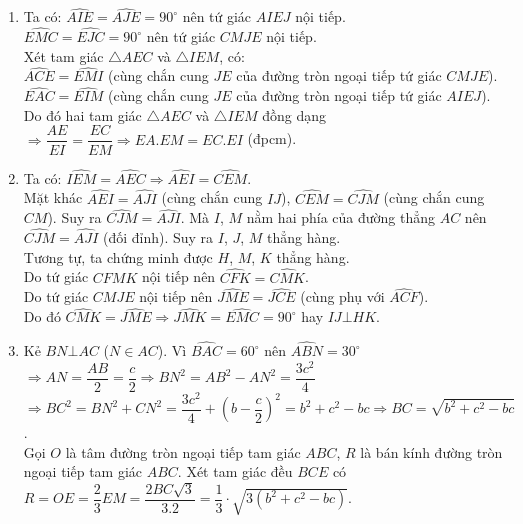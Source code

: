\begin{ex}
{\begin{enumerate}
\begin{center}
	\end{center}
	\item Ta có: $\widehat{AIE}=\widehat{AJE}=90^{\circ}$ nên tứ giác $AIEJ$ nội tiếp.\\
	$\widehat{EMC}=\widehat{EJC}=90^{\circ}$ nên tứ giác $CMJE$ nội tiếp.\\
	Xét tam giác $\triangle AEC$ và $\triangle IEM$, có:\\
	$\widehat{ACE}=\widehat{EMI}$ (cùng chắn cung $JE$ của đường tròn ngoại tiếp tứ giác $CMJE$).\\
	$\widehat{EAC}=\widehat{EIM}$ (cùng chắn cung $JE$ của đường tròn ngoại tiếp tứ giác $AIEJ$).\\
	Do đó hai tam giác $\triangle AEC$ và $\triangle IEM$ đồng dạng $\Rightarrow\dfrac{AE}{EI}=\dfrac{EC}{EM}\Rightarrow EA.EM=EC.EI$ (đpcm).
	\item Ta có: $\widehat{IEM}=\widehat{AEC}\Rightarrow \widehat{AEI}=\widehat{CEM}$.\\
	Mặt khác $\widehat{AEI}=\widehat{AJI}$ (cùng chắn cung $IJ$), $\widehat{CEM}=\widehat{CJM}$ (cùng chắn cung $CM$). Suy ra $\widehat{CJM}=\widehat{AJI}$. Mà $I$, $M$ nằm hai phía của đường thẳng $AC$ nên $\widehat{CJM}=\widehat{AJI}$ (đối đỉnh). Suy ra $I$, $J$, $M$ thẳng hàng.\\
	Tương tự, ta chứng minh được $H$, $M$, $K$ thẳng hàng.\\
	Do tứ giác $CFMK$ nội tiếp nên $\widehat{CFK}=\widehat{CMK}$.\\
	Do tứ giác $CMJE$ nội tiếp nên $\widehat{JME}=\widehat{JCE}$ (cùng phụ với $\widehat{ACF}$).\\
	Do đó $\widehat{CMK}=\widehat{JME}\Rightarrow \widehat{JMK}=\widehat{EMC}=90^{\circ}$ hay $IJ\bot HK$.
	\item Kẻ $BN\bot AC$ ($N\in AC$). Vì $\widehat{BAC}=60^{\circ}$ nên $\widehat{ABN}=30^{\circ}$\\
	$\Rightarrow AN=\dfrac{AB}{2}=\dfrac{c}{2}\Rightarrow BN^2=AB^2-AN^2=\dfrac{3c^2}{4}$\\
	$\Rightarrow BC^2=BN^2+CN^2=\dfrac{3c^2}{4}+\left(b-\dfrac{c}{2}\right)^2=b^2+c^2-bc\Rightarrow BC=\sqrt{b^2+c^2-bc}$.\\
	Gọi $O$ là tâm đường tròn ngoại tiếp tam giác $ABC$, $R$ là bán kính đường tròn ngoại tiếp tam giác $ABC$. Xét tam giác đều $BCE$ có $R=OE=\dfrac{2}{3}EM=\dfrac{2BC\sqrt{3}}{3.2}=\dfrac{1}{3}\cdot\sqrt{3(b^2+c^2-bc)}$.
\end{enumerate}}
\end{ex}

